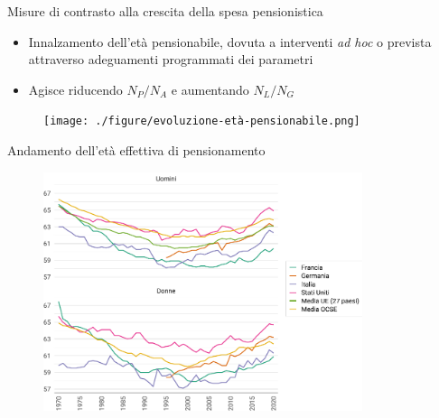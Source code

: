 \documentclass[11pt]{beamer}
\begin{document}
\begin{frame}{Misure di contrasto alla crescita della spesa pensionistica}
\begin{itemize}
\item Innalzamento dell'età pensionabile, dovuta a interventi \emph{ad hoc} o prevista
attraverso adeguamenti programmati dei parametri
\item Agisce riducendo $N_P/N_A$ e aumentando $N_L/N_G$
\end{itemize}

\begin{figure}[htbp]
\centering
\texttt{[image: ./figure/evoluzione-età-pensionabile.png]}
\end{figure}
\end{frame}


\begin{frame}{Andamento dell'età effettiva di pensionamento}
\begin{figure}[htbp]
\centering
\includegraphics[height=7cm]{./figure/eta-effettiva-pensionamento-color.pdf}
\end{figure}
\end{frame}
\end{document}
